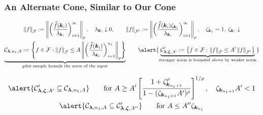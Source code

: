 \documentclass[10pt,compress,xcolor={usenames,dvipsnames},aspectratio=169]{beamer}
\begin{document}
\begin{frame}
	\frametitle{An Alternate Cone, Similar to Our Cone}
	\vspace{-5.5ex}
	\begin{gather*}
	\norm[\cf]{f} : = \norm[\rho]{\biggl ( \frac{\hf(\vk_i) }{\lambda_{\vk_i}} \biggr) _{i=1}^\infty}, \quad \lambda_{\vk_i} \downarrow 0, \qquad
	\norm[\cf']{f} : = \norm[\rho]{\biggl ( \frac{\hf(\vk_i) \zeta_{\vk_i}}{\lambda_{\vk_i}} \biggr) _{i=1}^\infty},  
	\quad \zeta_{\vk_1} = 1, \; \zeta_{\vk_i} \downarrow
\\
	\underbrace{\cc_{\vlambda, n_1, A} : = \Biggl\{ f \in \cf : \norm[\cf]{f} \le A\norm[\rho]{\biggl ( \frac{\hf(\vk_i) }{\lambda_{\vk_i}} \biggr) _{i=1}^{n_1}} \Biggr\} }_{\text{pilot sample bounds the norm of the input}}
	\qquad 
	\alert{\underbrace{\cc'_{\vlambda, \vzeta, A'} : = \bigl \{ f \in \cf : \norm[\cf]{f} \le A'\norm[\cf']{f} \bigr \} }_{\text{stronger norm is bounded above by weaker norm}}}
	\end{gather*}

		\begin{gather*}
\alert{\cc'_{\vlambda, \vzeta, A'} \subseteq \cc_{\vlambda, n_1, A}}  \qquad 
\text{for } A \ge A'\left[\frac{1 + \zeta_{\vk_{n_1+1}}^\rho}{1 - (\zeta_{\vk_{n_1+1}}A')^\rho}\right]^{1/\rho},  \quad \zeta_{\vk_{n_1+1}}A' < 1  \\
\alert{\cc_{\vlambda, n_1, A} \subseteq \cc'_{\vlambda, \vzeta, A''} }  \qquad 
\text{for } A \le A'' \zeta_{\vk_{n_1}}
		\end{gather*}

\end{frame}
\end{document}
